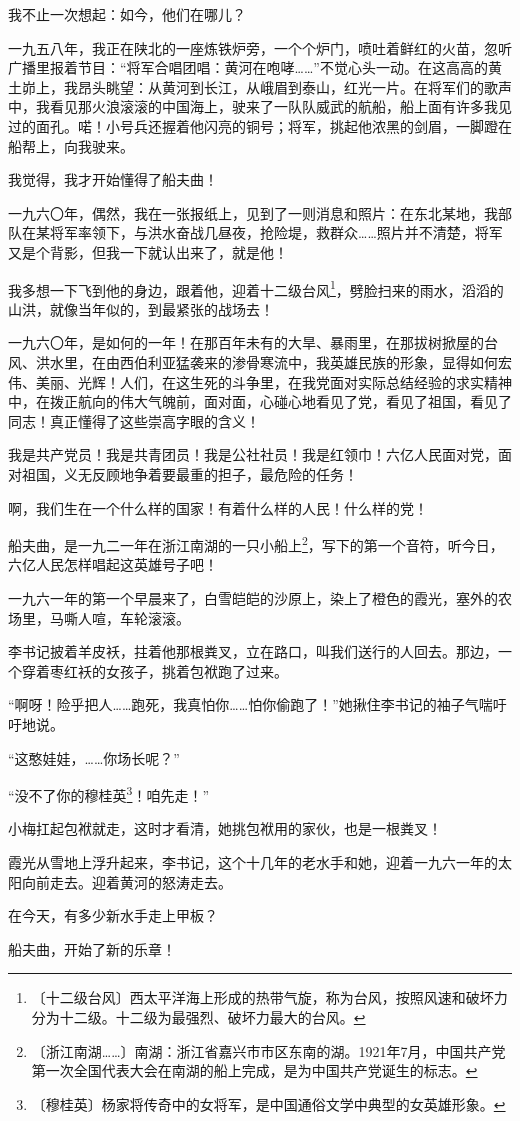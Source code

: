 \documentclass[12pt,UTF-8,openany]{ctexbook}
\begin{document}
\begin{normalsize}
    我不止一次想起：如今，他们在哪儿？
    
    一九五八年，我正在陕北的一座炼铁炉旁，一个个炉门，喷吐着鲜红的火苗，忽听广播里报着节目：“将军合唱团唱：黄河在咆哮……”不觉心头一动。在这高高的黄土峁上，我昂头眺望：从黄河到长江，从峨眉到泰山，红光一片。在将军们的歌声中，我看见那火浪滚滚的中国海上，驶来了一队队威武的航船，船上面有许多我见过的面孔。喏！小号兵还握着他闪亮的铜号；将军，挑起他浓黑的剑眉，一脚蹬在船帮上，向我驶来。
    
    我觉得，我才开始懂得了船夫曲！
    
    一九六〇年，偶然，我在一张报纸上，见到了一则消息和照片：在东北某地，我部队在某将军率领下，与洪水奋战几昼夜，抢险堤，救群众……照片并不清楚，将军又是个背影，但我一下就认出来了，就是他！
    
    我多想一下飞到他的身边，跟着他，迎着十二级台风\footnote{〔十二级台风〕西太平洋海上形成的热带气旋，称为台风，按照风速和破坏力分为十二级。十二级为最强烈、破坏力最大的台风。}，劈脸扫来的雨水，滔滔的山洪，就像当年似的，到最紧张的战场去！
    
    一九六〇年，是如何的一年！在那百年未有的大旱、暴雨里，在那拔树掀屋的台风、洪水里，在由西伯利亚猛袭来的渗骨寒流中，我英雄民族的形象，显得如何宏伟、美丽、光辉！人们，在这生死的斗争里，在我党面对实际总结经验的求实精神中，在拨正航向的伟大气魄前，面对面，心碰心地看见了党，看见了祖国，看见了同志！真正懂得了这些崇高字眼的含义！
    
    我是共产党员！我是共青团员！我是公社社员！我是红领巾！六亿人民面对党，面对祖国，义无反顾地争着要最重的担子，最危险的任务！
    
    啊，我们生在一个什么样的国家！有着什么样的人民！什么样的党！
    
    船夫曲，是一九二一年在浙江南湖的一只小船上\footnote{〔浙江南湖……〕南湖：浙江省嘉兴市市区东南的湖。1921年7月，中国共产党第一次全国代表大会在南湖的船上完成，是为中国共产党诞生的标志。}，写下的第一个音符，听今日，六亿人民怎样唱起这英雄号子吧！
    
    一九六一年的第一个早晨来了，白雪皑皑的沙原上，染上了橙色的霞光，塞外的农场里，马嘶人喧，车轮滚滚。
    
    李书记披着羊皮袄，拄着他那根粪叉，立在路口，叫我们送行的人回去。那边，一个穿着枣红袄的女孩子，挑着包袱跑了过来。
    
    “啊呀！险乎把人……跑死，我真怕你……怕你偷跑了！”她揪住李书记的袖子气喘吁吁地说。
    
    “这憨娃娃，……你场长呢？”
    
    “没不了你的穆桂英\footnote{〔穆桂英〕杨家将传奇中的女将军，是中国通俗文学中典型的女英雄形象。}！咱先走！”
    
    小梅扛起包袱就走，这时才看清，她挑包袱用的家伙，也是一根粪叉！
    
    霞光从雪地上浮升起来，李书记，这个十几年的老水手和她，迎着一九六一年的太阳向前走去。迎着黄河的怒涛走去。
    
    在今天，有多少新水手走上甲板？
    
    船夫曲，开始了新的乐章！
    
\end{normalsize}
\end{document}
